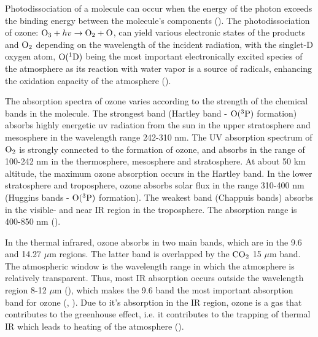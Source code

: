 Photodissociation of a molecule can occur when the energy of the photon exceeds the binding energy between the molecule's components (\cite{SeinfeldSpyros}). The photodissociation of ozone: $\mathrm{O_3} + hv \rightarrow \mathrm{O_2} + \mathrm{O}$, can yield various electronic states of the products  and $\mathrm{O_2}$ depending on the wavelength of the incident radiation, with the singlet-D oxygen atom, $\mathrm{O}(^1\mathrm{D})$ being the most important electronically excited species of the atmosphere as its reaction with water vapor is a source of  radicals, enhancing the oxidation capacity of the atmosphere (\cite{SeinfeldSpyros}).


\medskip

The absorption spectra of ozone varies according to the strength of the chemical bands in the molecule. The strongest band (Hartley band - $\mathrm{O(^3P)}$ formation) absorbs highly energetic \acrfull{uv} radiation from the sun in the upper stratosphere and mesosphere in the wavelength range 242-310 nm. The UV absorption spectrum of $\mathrm{O_2}$ is strongly connected to the formation of ozone, and absorbs in the range of 100-242 nm in the thermosphere, mesosphere and stratosphere. At about 50 km altitude, the maximum ozone absorption occurs in the Hartley band. In the lower stratosphere and troposphere, ozone absorbs solar flux in the range 310-400 nm (Huggins bands - $\mathrm{O(^3P)}$ formation). The weakest band (Chappuis bands) absorbs in the visible- and near IR region in the troposphere. The absorption range is 400-850 nm (\cite{Liou_AtmRad}). 



\medskip 

In the thermal infrared, ozone absorbs in two main bands, which are in the 9.6 and 14.27 $\mu$m regions. The latter band is overlapped by the $\mathrm{CO_2}$ 15 $\mu$m band. The atmospheric window is the wavelength range in which the atmosphere is relatively transparent. Thus, most IR absorption occurs outside the wavelength region 8-12 $\mu$m (\cite{AtmModFund}), which makes the 9.6 band the most important absorption band for ozone (\cite{Liou_AtmRad}, \cite{Myhre1997}). Due to it's absorption in the IR region, ozone is a gas that contributes to the greenhouse effect, i.e. it contributes to the trapping of thermal IR which leads to heating of the atmosphere (\cite{Liou_AtmRad}).

\medskip



